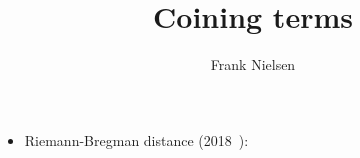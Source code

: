 \documentclass{article}
\title{Coining terms}
\author{Frank Nielsen}
\begin{document}
\maketitle

\begin{itemize}

\item Riemann-Bregman distance (2018~\cite{RieBreg-2018,RieBreg-2019}):


\end{itemize}



\end{document}
